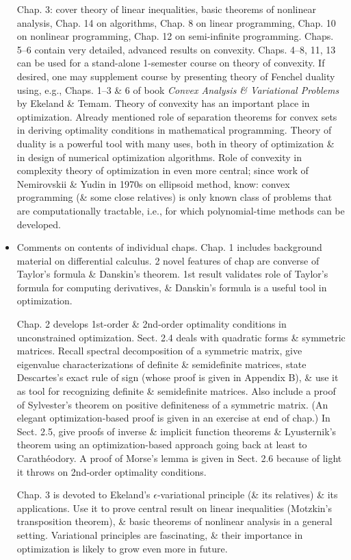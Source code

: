 \documentclass{article}
\begin{document}
\begin{itemize}
    Chap. 3: cover theory of linear inequalities, basic theorems of nonlinear analysis, Chap. 14 on algorithms, Chap. 8 on linear programming, Chap. 10 on nonlinear programming, Chap. 12 on semi-infinite programming. Chaps. 5--6 contain very detailed, advanced results on convexity. Chaps. 4--8, 11, 13 can be used for a stand-alone 1-semester course on theory of convexity. If desired, one may supplement course by presenting theory of Fenchel duality using, e.g., Chaps. 1--3 \& 6 of book {\it Convex Analysis \& Variational Problems} by {\sc Ekeland \& Temam}. Theory of convexity has an important place in optimization. Already mentioned role of separation theorems for convex sets in deriving optimality conditions in mathematical programming. Theory of duality is a powerful tool with many uses, both in theory of optimization \& in design of numerical optimization algorithms. Role of convexity in complexity theory of optimization in even more central; since work of {\sc Nemirovskii \& Yudin} in 1970s on ellipsoid method, know: convex programming (\& some close relatives) is only known class of problems that are computationally tractable, i.e., for which polynomial-time methods can be developed.
    \item {\sf Comments on contents of individual chaps.} Chap. 1 includes background material on differential calculus. 2 novel features of chap are converse of Taylor's formula \& Danskin's theorem. 1st result validates role of Taylor's formula for computing derivatives, \& Danskin's formula is a useful tool in optimization.
    
    Chap. 2 develops 1st-order \& 2nd-order optimality conditions in unconstrained optimization. Sect. 2.4 deals with quadratic forms \& symmetric matrices. Recall spectral decomposition of a symmetric matrix, give eigenvalue characterizations of definite \& semidefinite matrices, state Descartes's exact rule of sign (whose proof is given in Appendix B), \& use it as tool for recognizing definite \& semidefinite matrices. Also include a proof of Sylvester's theorem on positive definiteness of a symmetric matrix. (An elegant optimization-based proof is given in an exercise at end of chap.) In Sect. 2.5, give proofs of inverse \& implicit function theorems \& Lyusternik's theorem using an optimization-based approach going back at least to Carathéodory. A proof of Morse's lemma is given in Sect. 2.6 because of light it throws on 2nd-order optimality conditions.
    
    Chap. 3 is devoted to Ekeland's $\epsilon$-variational principle (\& its relatives) \& its applications. Use it to prove central result on linear inequalities (Motzkin's transposition theorem), \& basic theorems of nonlinear analysis in a general setting. Variational principles are fascinating, \& their importance in optimization is likely to grow even more in future.
    

\end{itemize}
\end{document}
